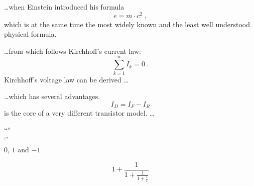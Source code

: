 \documentclass[a4paper]{article}
\begin{document}
\ldots when Einstein introduced his formula
\begin{equation}
e = m \cdot c^2 \; ,
\end{equation}
which is at the same time the most widely known
and the least well understood physical formula.

\ldots from which follows Kirchhoff’s current law:
\begin{equation}
\sum_{k=1}^{n} I_k = 0 \; .
\end{equation}
Kirchhoff’s voltage law can be derived \ldots

\ldots which has several advantages.
\begin{equation}
I_D = I_F - I_R
\end{equation}
is the core of a very different transistor model. \ldots


``''\\`'\\$0$, $1$ and $-1$

$$1+\frac{1}{1+\frac{1}{1+\frac{1}{1}}}$$
\end{document}
